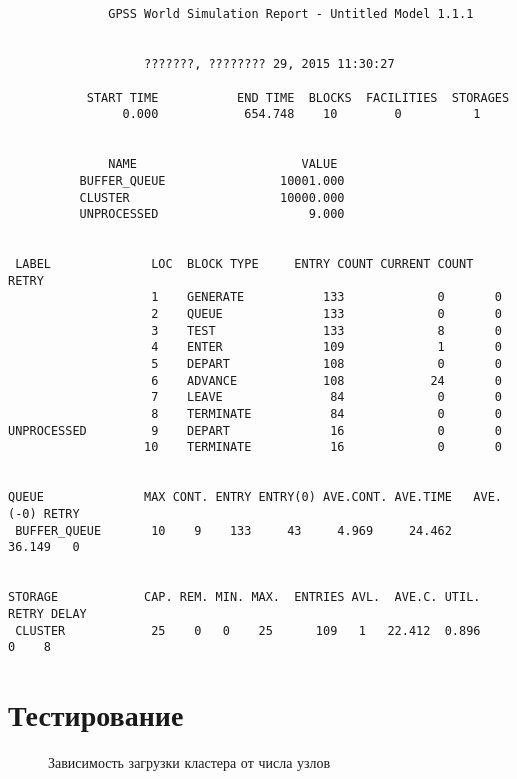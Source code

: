 \documentclass[12pt,a4paper,oneside]{extarticle}
\begin{document}
        \begin{lstlisting}


              GPSS World Simulation Report - Untitled Model 1.1.1


                   ???????, ???????? 29, 2015 11:30:27  

           START TIME           END TIME  BLOCKS  FACILITIES  STORAGES
                0.000            654.748    10        0          1


              NAME                       VALUE  
          BUFFER_QUEUE                10001.000
          CLUSTER                     10000.000
          UNPROCESSED                     9.000


 LABEL              LOC  BLOCK TYPE     ENTRY COUNT CURRENT COUNT RETRY
                    1    GENERATE           133             0       0
                    2    QUEUE              133             0       0
                    3    TEST               133             8       0
                    4    ENTER              109             1       0
                    5    DEPART             108             0       0
                    6    ADVANCE            108            24       0
                    7    LEAVE               84             0       0
                    8    TERMINATE           84             0       0
UNPROCESSED         9    DEPART              16             0       0
                   10    TERMINATE           16             0       0


QUEUE              MAX CONT. ENTRY ENTRY(0) AVE.CONT. AVE.TIME   AVE.(-0) RETRY
 BUFFER_QUEUE       10    9    133     43     4.969     24.462     36.149   0


STORAGE            CAP. REM. MIN. MAX.  ENTRIES AVL.  AVE.C. UTIL. RETRY DELAY
 CLUSTER            25    0   0    25      109   1   22.412  0.896    0    8
   \end{lstlisting}

\section{Тестирование}
\label{sec:test}
        \begin{figure}[h!]        
        \centering
        \caption{Зависимость загрузки кластера от числа узлов}
        \label{pic:test}
        \end{figure}
\end{document}
